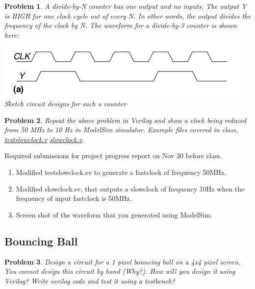 \documentclass{article}
\newtheorem{prob}{Problem}
\begin{document}
\begin{prob}
  A divide-by-N counter has one output and no inputs. The output Y is HIGH for
  one clock cycle out of every N. In other words, the output divides the frequency
  of the clock by N. The waveform for a divide-by-3 counter is shown here:\\
  \includegraphics[width=0.8\linewidth]{./fig/fig.38a-divide-by-3-counter.png}\\
  Sketch circuit designs for such a counter
\end{prob}

\begin{prob}
  Repeat the above problem in Verilog and show a clock being reduced from 50 MHz
  to 10 Hz in ModelSim simulator. Example files covered in class,
  \href{https://vikasdhiman.info/ECE275-Sequential-Logic/lab_pdfs/pongproject-kickoff/slowclock/testslowclock.sv}{testslowclock.v}
    \href{https://vikasdhiman.info/ECE275-Sequential-Logic/lab_pdfs/pongproject-kickoff/slowclock/slowclock.sv}{slowclock.v}.
\end{prob}

{\color{red}
  Required submissions for project progress report on Nov 30 before class.
  \begin{enumerate}
  \item Modified testslowclock.sv to generate a fastclock of frequency 50MHz.
  \item Modified slowclock.sv, that outputs a slowclock of frequency 10Hz when
    the frequency of input fastclock is 50MHz.
  \item Screen shot of the waveform that you generated using ModelSim.
  \end{enumerate}
}

\subsection{Bouncing Ball}

\begin{prob}
  Design a circuit for a 1 pixel bouncing ball on a 4x4 pixel screen. You cannot design
this circuit by hand (Why?). How will you design it using Verilog? Write verilog
code and test it using a testbench?
\end{prob}
\end{document}

